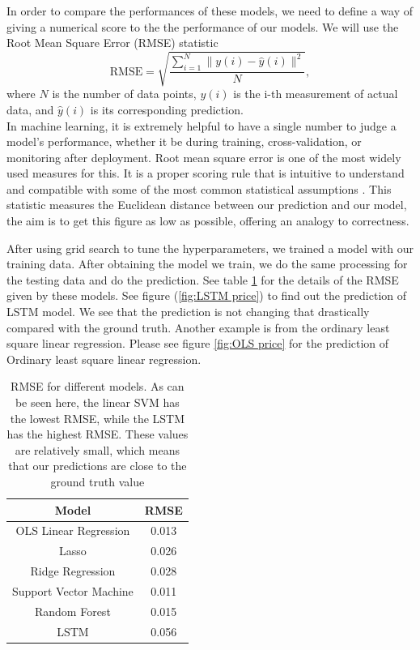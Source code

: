 \documentclass[twoside]{report}
\begin{document}
\begin{spacing}{1}
In order to compare the performances of these models, we need to define a way of giving a numerical score to the the performance of our models. We will use the Root Mean Square Error (RMSE) statistic
\[\textrm{RMSE} =\sqrt{\frac{\sum_{i=1}^{N}\|y(i)-\hat{y}(i)\|^{2}}{N}},\] where $N$ is the number of data points, $y(i)$ is the i-th measurement of actual data, and $\hat{y}(i)$ is its corresponding prediction.\\
In machine learning, it is extremely helpful to have a single number to judge a model’s performance, whether it be during training, cross-validation, or monitoring after deployment. Root mean square error is one of the most widely used measures for this. It is a proper scoring rule that is intuitive to understand and compatible with some of the most common statistical assumptions \cite{hyndman2006another}. This statistic measures the Euclidean distance between our prediction and our model, the aim is to get this figure as low as possible, offering an analogy to correctness.  

After using grid search to tune the hyperparameters, we trained a model with our training data. After obtaining the model we train, we do the same processing for the testing data and do the prediction.
See table \ref{tab:RMSE} for the details of the RMSE given by these models. See figure (\ref{fig:LSTM price}) to find out the prediction of LSTM model. We see that the prediction is not changing that drastically compared with the ground truth. Another example is from the ordinary least square linear regression. Please see figure \ref{fig:OLS price} for the prediction of Ordinary least square linear regression. 


\begin{table}[]
    \centering
    \begin{tabular}{|c|c|}
    \hline
        Model & RMSE\\ \hline
         OLS Linear Regression& 0.013         \\
         Lasso& 0.026\\
         Ridge Regression& 0.028\\
         Support Vector Machine& 0.011      \\
         Random Forest &  0.015       \\
         LSTM & 0.056\\
    \hline
    \end{tabular}
    \caption{RMSE for different models. As can be seen here, the linear SVM has the lowest RMSE, while the LSTM has the highest RMSE. These values are relatively small, which means that our predictions are close to the ground truth value}
    \label{tab:RMSE}
\end{table}



\end{spacing}
\end{document}
